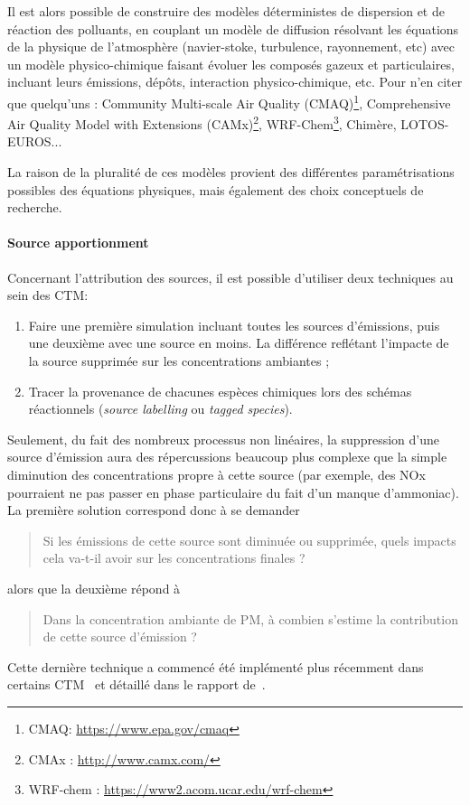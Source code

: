 Il est alors possible de construire des modèles déterministes de dispersion et de
réaction des polluants, en couplant un modèle de diffusion résolvant les équations de la
physique de l'atmosphère (navier-stoke, turbulence, rayonnement, etc) avec un modèle
physico-chimique faisant évoluer les composés gazeux et particulaires, incluant leurs
émissions, dépôts, interaction physico-chimique, etc. Pour n'en citer que quelqu'uns : 
Community Multi-scale Air Quality (CMAQ)\footnote{CMAQ: \url{https://www.epa.gov/cmaq}},
Comprehensive Air Quality Model with Extensions (CAMx)\footnote{CMAx : \url{http://www.camx.com/}},
WRF-Chem\footnote{WRF-chem : \url{https://www2.acom.ucar.edu/wrf-chem}},
Chimère,
LOTOS-EUROS...

La raison de la pluralité de ces modèles provient des différentes paramétrisations
possibles des équations physiques, mais également des choix conceptuels de recherche.

\paragraph{Source apportionment}%
\label{par:source_apportionment}

Concernant l'attribution des sources, il est possible d'utiliser deux techniques au sein
des CTM:

\begin{enumerate}
    \item Faire une première simulation incluant toutes les sources d'émissions, puis une
        deuxième avec une source en moins. La différence reflétant l'impacte de la source
        supprimée sur les concentrations ambiantes ;
    \item Tracer la provenance de chacunes espèces chimiques lors des schémas réactionnels
        (\textit{source labelling} ou \textit{tagged species}).
\end{enumerate}

Seulement, du fait des nombreux processus non linéaires, la suppression d'une source
d'émission aura des répercussions beaucoup plus complexe que la simple diminution des
concentrations propre à cette source (par exemple, des NOx pourraient ne pas passer en
phase particulaire du fait d'un manque d'ammoniac). La première solution correspond donc à
se demander 
\begin{quote}
    Si les émissions de cette source sont diminuée ou supprimée, quels impacts cela va-t-il
    avoir sur les concentrations finales ?
\end{quote}
alors que la deuxième répond à
\begin{quote}
    Dans la concentration ambiante de PM, à combien s'estime la contribution de cette source
    d'émission ?
\end{quote}
Cette dernière technique a commencé été implémenté plus récemment dans certains
CTM~\autocite{wangDevelopment2009,wagstromDevelopment2008,kranenburgSource2013,brandtContribution2013}
et détaillé dans le rapport de~\textcite{mirceaEuropean2020}.

